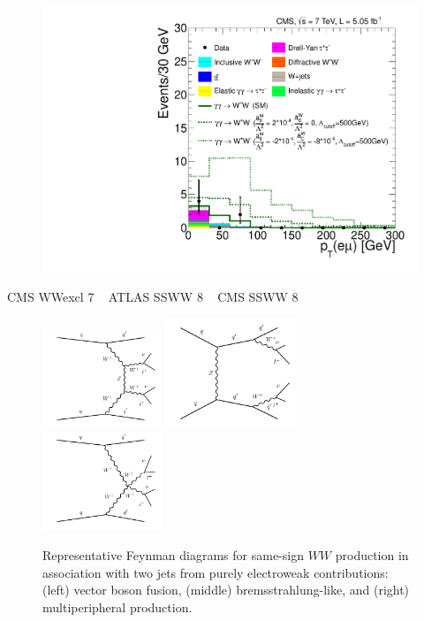 \begin{figure}[p]
    \centering
    \includegraphics[height=0.3\textheight]{figures/ss-exclboson-ww-cms7tev}
    \caption{}
    \label{fig:ss-exclboson-ww-cms7tev}
\end{figure}
CMS WWexcl 7 \TeV~\cite{Chatrchyan:2013foa}
ATLAS SSWW 8 \TeV~\cite{Aad:2014zda}
CMS SSWW 8 \TeV~\cite{Khachatryan:2014sta}


\begin{figure}[htb] {
\centering
\includegraphics[width=0.315\textwidth]{figures/ss-exclboson-ww-diagram1.pdf}
\includegraphics[width=0.35\textwidth]{figures/ss-exclboson-ww-diagram2.pdf}
\includegraphics[width=0.315\textwidth]{figures/ss-exclboson-ww-diagram3.pdf}
\caption{
Representative Feynman diagrams for same-sign $WW$ production in association
with two jets from purely electroweak contributions:
(left) vector boson fusion,
(middle) bremsstrahlung-like,
and (right) multiperipheral production.
\label{fig:ss-exclboson-ww-sigdiagram}}

}
\end{figure}


